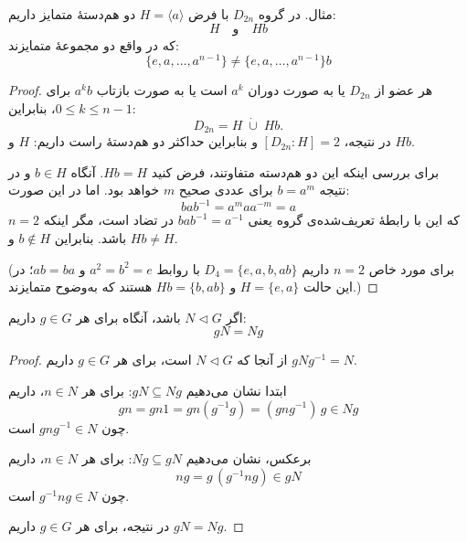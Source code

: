 \begin{frame}

    \begin{example}
        مثال. در گروه $D_{2n}$ با فرض $H = \langle a \rangle$ دو هم‌دستهٔ متمایز داریم:
        \[
            H \quad \text{و} \quad Hb
        \]
        که در واقع دو مجموعهٔ متمایزند:
        \[
            \{e, a, \ldots, a^{n-1} \} \neq \{e, a, \ldots, a^{n-1} \}b
        \]
    \end{example}






\end{frame}
\begin{frame}
    \begin{proof}
        هر عضو از \(D_{2n}\) یا به صورت دوران \(a^k\) است یا به صورت بازتاب \(a^k b\) برای \(0\le k\le n-1\)، بنابراین:
        \[
            D_{2n}=H\;\dot\cup\;Hb.
        \]
        در نتیجه، \([D_{2n}:H]=2\) و بنابراین حداکثر دو هم‌دستهٔ راست داریم: \(H\) و \(Hb\).

        برای بررسی اینکه این دو هم‌دسته متفاوتند، فرض کنید \(Hb = H\). آنگاه \(b \in H\) و در نتیجه \(b = a^m\) برای عددی صحیح \(m\) خواهد بود. اما در این صورت:
        \[
            bab^{-1}=a^m a a^{-m}=a
        \]
        که این با رابطهٔ تعریف‌شده‌ی گروه یعنی \(bab^{-1} = a^{-1}\) در تضاد است، مگر اینکه \(n=2\) باشد. بنابراین \(b\notin H\) و \(Hb\ne H\).

        (برای مورد خاص \(n=2\) داریم \(D_4=\{e,a,b,ab\}\) با روابط \(a^2=b^2=e\) و \(ab=ba\)؛ در این حالت
        \(H=\{e,a\}\) و \(Hb=\{b,ab\}\) هستند که به‌وضوح متمایزند.)
    \end{proof}

\end{frame}

\begin{frame}
    \begin{lemma}
        اگر $N \triangleleft G$ باشد، آنگاه برای هر $g \in G$ داریم:
        \[
            gN = Ng
        \]
    \end{lemma}


    \begin{proof}
        از آنجا که \(N \triangleleft G\) است، برای هر \(g \in G\) داریم \(gNg^{-1} = N\).

        ابتدا نشان می‌دهیم \(gN \subseteq Ng\): برای هر \(n \in N\)، داریم
        \[
            gn = gn1 = gn(g^{-1}g) =(gng^{-1})\,g \in Ng
        \]
        چون \(gng^{-1} \in N\) است.

        برعکس، نشان می‌دهیم \(Ng \subseteq gN\): برای هر \(n \in N\)، داریم
        \[
            ng = g\,(g^{-1}ng) \in gN
        \]
        چون \(g^{-1}ng \in N\) است.

        در نتیجه، برای هر \(g \in G\) داریم \(gN = Ng\).
    \end{proof}
\end{frame}

